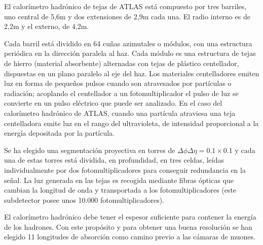    El calor\'imetro hadr\'onico de tejas de ATLAS est\'a compuesto por tres barriles, uno central de 5,6m y dos extensiones de 2,9m cada una. El radio interno es de 2,2m y el externo, de 4,2m.  

   Cada barril est\'a dividido en 64 cu\~nas azimutales o m\'odulos, con una estructura peri\'odica en la direcci\'on paralela al haz. Cada m\'odulo es una estructura de tejas de hierro (material absorbente) alternadas con tejas de pl\'astico centellador, dispuestas en un plano paralelo al eje del haz.  Los materiales centelladores emiten luz en forma de peque\~nos pulsos cuando son atravesados por part\'iculas o radiaci\'on; acoplando el centellador a un fotomultiplicador el pulso de luz se convierte en un pulso el\'ectrico que puede ser analizado.  En el caso del calor\'imetro hadr\'onico de ATLAS, cuando una part\'icula atraviesa una teja centelladora emite luz en el rango del ultravioleta, de intensidad proporcional a la energ\'ia depositada por la part\'icula. 

   Se ha elegido una segmentaci\'on proyectiva en torres de $\Delta\phi\Delta\eta=0.1\times 0.1$ y cada una de estas torres est\'a dividida, en profundidad, en tres celdas, le\'idas individualmente por dos fotomultiplicadores para conseguir redundancia en la se\~nal. La luz generada en las tejas es recogida mediante fibras \'opticas que cambian la longitud de onda y transportada a los fotomultiplicadores (este subdetector posee unos 10.000 fotomultiplicadores).

   El calor\'imetro hadr\'onico debe tener el espesor suficiente para contener la energ\'ia de los hadrones. Con este prop\'osito y para obtener una buena resoluci\'on se han elegido 11 longitudes de absorci\'on como camino previo a las c\'amaras de muones.
 

